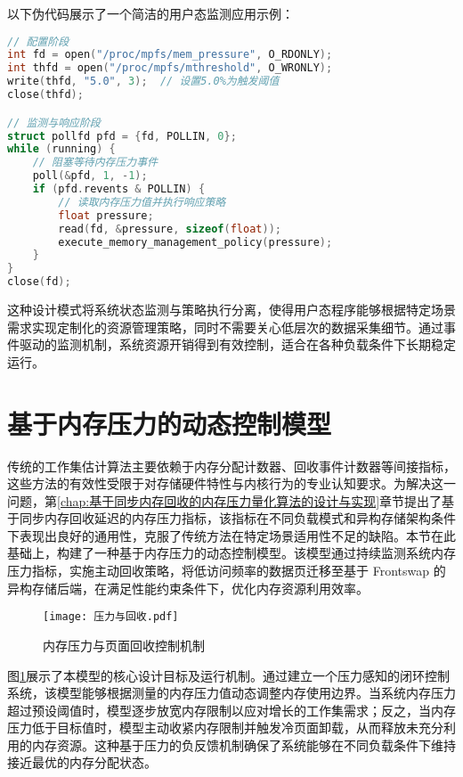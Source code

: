 以下伪代码展示了一个简洁的用户态监测应用示例：

\begin{lstlisting}[language=C]
// 配置阶段
int fd = open("/proc/mpfs/mem_pressure", O_RDONLY);
int thfd = open("/proc/mpfs/mthreshold", O_WRONLY);
write(thfd, "5.0", 3);  // 设置5.0%为触发阈值
close(thfd);

// 监测与响应阶段
struct pollfd pfd = {fd, POLLIN, 0};
while (running) {
    // 阻塞等待内存压力事件
    poll(&pfd, 1, -1);
    if (pfd.revents & POLLIN) {
        // 读取内存压力值并执行响应策略
        float pressure;
        read(fd, &pressure, sizeof(float));
        execute_memory_management_policy(pressure);
    }
}
close(fd);
\end{lstlisting}

这种设计模式将系统状态监测与策略执行分离，使得用户态程序能够根据特定场景需求实现定制化的资源管理策略，同时不需要关心低层次的数据采集细节。通过事件驱动的监测机制，系统资源开销得到有效控制，适合在各种负载条件下长期稳定运行。

\section{基于内存压力的动态控制模型}
\label{sec:pressure_based_model}

传统的工作集估计算法主要依赖于内存分配计数器、回收事件计数器等间接指标，这些方法的有效性受限于对存储硬件特性与内核行为的专业认知要求。为解决这一问题，第\ref{chap:基于同步内存回收的内存压力量化算法的设计与实现}章节提出了基于同步内存回收延迟的内存压力指标，该指标在不同负载模式和异构存储架构条件下表现出良好的通用性，克服了传统方法在特定场景适用性不足的缺陷。本节在此基础上，构建了一种基于内存压力的动态控制模型。该模型通过持续监测系统内存压力指标，实施主动回收策略，将低访问频率的数据页迁移至基于 Frontswap 的异构存储后端，在满足性能约束条件下，优化内存资源利用效率。

\begin{figure}[h]
\centering
\texttt{[image: 压力与回收.pdf]}
\caption{内存压力与页面回收控制机制}
\label{fig:pressure_work_set}
\end{figure}

图\ref{fig:pressure_work_set}展示了本模型的核心设计目标及运行机制。通过建立一个压力感知的闭环控制系统，该模型能够根据测量的内存压力值动态调整内存使用边界。当系统内存压力超过预设阈值时，模型逐步放宽内存限制以应对增长的工作集需求；反之，当内存压力低于目标值时，模型主动收紧内存限制并触发冷页面卸载，从而释放未充分利用的内存资源。这种基于压力的负反馈机制确保了系统能够在不同负载条件下维持接近最优的内存分配状态。


